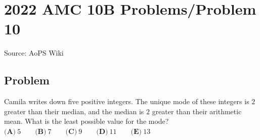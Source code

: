 \documentclass[12pt]{article}
\begin{document}
\section*{{2022 AMC 10B Problems/Problem 10}}
Source: AoPS Wiki

\subsection*{Problem}
Camila writes down five positive integers. The unique mode of these integers is $2$ greater than their median, and the median is $2$ greater than their arithmetic mean. What is the least possible value for the mode? $\textbf{(A)}\ 5 \qquad\textbf{(B)}\ 7 \qquad\textbf{(C)}\ 9 \qquad\textbf{(D)}\ 11 \qquad\textbf{(E)}\ 13$
\end{document}
